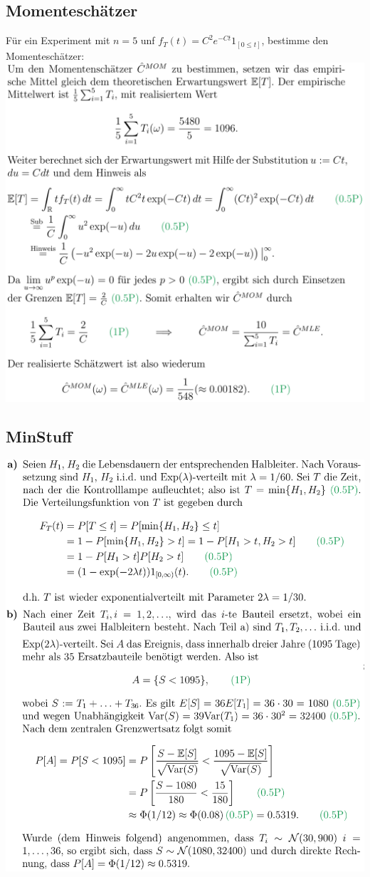 \subsection{Momenteschätzer}
Für ein Experiment mit $n=5$ unf $f_T(t) = C^2 e^{-Ct} 1_{[0 \le t]}$, bestimme den Momenteschätzer:
\\\includegraphics[width=\linewidth]{./Figures/Momente_Schaetzer.png}

\subsection{MinStuff}
\includegraphics[width=\linewidth]{./Figures/ExampleMinStuff.png}

